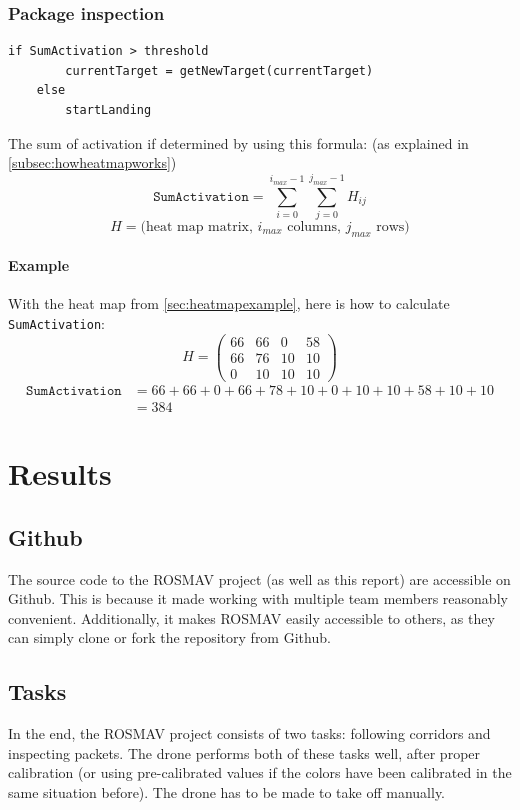 \documentclass[a4paper,10pt]{article}
\begin{document}
\subsubsection{Package inspection\label{sec:packageinspection}}
\begin{verbatim}
if SumActivation > threshold
        currentTarget = getNewTarget(currentTarget)
    else
        startLanding
\end{verbatim}
The sum of activation if determined by using this formula: (as explained in \ref{subsec:howheatmapworks})
\[\texttt{SumActivation} = \sum_{i=0}^{i_{max}-1} \sum_{j=0}^{j_{max}-1} H_{ij}\]
\[H = \textrm{(heat map matrix, $i_{max}$ columns, $j_{max}$ rows)}\]

\paragraph{Example}
With the heat map from \ref{sec:heatmapexample}, here is how to calculate
\texttt{SumActivation}:
\[H = \left(\begin{array}{cccc}
66 & 66 & 0 & 58 \\
66 & 76 & 10 & 10 \\
0 & 10 & 10 & 10 \end{array}\right)\]
\begin{align*}\texttt{SumActivation} &= 66 + 66 + 0 + 66 + 78 + 10 + 0 + 10 + 10
+ 58 + 10 + 10
\\ &= 384 \end{align*}
\section{Results}

\subsection{Github}
The source code to the ROSMAV project (as well as this report) are accessible
on Github. This is because it made working with multiple team members
reasonably convenient. Additionally, it makes ROSMAV easily accessible to
others, as they can simply clone or fork the repository from Github.
\subsection{Tasks}
In the end, the ROSMAV project consists of two tasks: following corridors and
inspecting packets. The drone performs both of these tasks well, after proper
calibration (or using pre-calibrated values if the colors have been calibrated
in the same situation before). The drone has to be made to take off manually.
\end{document}
